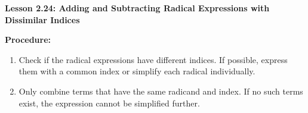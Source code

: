 \begin{center}
\textbf{Lesson 2.24: Adding and Subtracting Radical Expressions with Dissimilar Indices}
\end{center}

\vspace*{1ex}

\noindent\textbf{Procedure:}
\begin{enumerate}
    \item Check if the radical expressions have different indices. If possible, express them with a common index or simplify each radical individually.
    \item Only combine terms that have the same radicand and index. If no such terms exist, the expression cannot be simplified further.
\end{enumerate}
